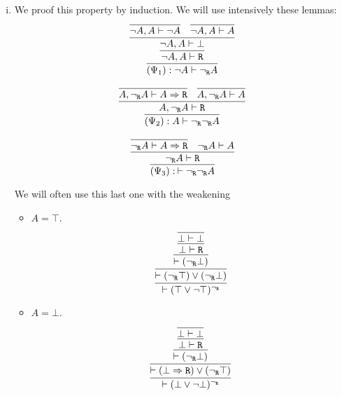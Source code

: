 \begin{enumerate}[(i)]
    \item We proof this property by induction.
    We will use intensively these lemmas:
    $$
    \infer{
        (\Psi_1) : \neg A \vdash \neg_\R A
    }{
        \infer{
            \neg A, A \vdash \R
        }{
            \infer{
                \neg A, A \vdash \bot
            }{
                \infer{
                    \neg A, A \vdash \neg A
                }{
                }&
                \infer{
                    \neg A, A \vdash A
                }{
                }
            }
        }
    }
    $$
    
    $$
    \infer{
        (\Psi_2) : A \vdash \neg_\R \neg_\R A
    }{
        \infer{
            A, \neg_\R A \vdash \R
        }{
            \infer{
                A, \neg_\R A \vdash A\Rightarrow \R
            }{
            }&
            \infer{
                A, \neg_\R A \vdash A
            }{
            }
        }
    }
    $$
    
    $$
    \infer{
        (\Psi_3) :\: \vdash \neg_\R \neg_\R A
    }{
        \infer{
             \neg_\R A \vdash \R
        }{
            \infer{
                 \neg_\R A \vdash A\Rightarrow \R
            }{
            }&
            \neg_\R A \vdash A
        }
    }
    $$
    
    We will often use this last one with the weakening
    
    \begin{itemize}
        \item $A = \top$.
            $$
            \infer{
                \vdash (\top \vee \neg \top)^{\neg_\R}
            }{
                \infer{
                    \vdash (\neg_\R \top) \vee (\neg_\R \bot)
                }{
                    \infer{
                        \vdash (\neg_\R \bot)
                    }{
                        \infer{
                            \bot \vdash \R
                        }{
                            \infer{
                                \bot \vdash \bot
                            }{
                            }
                        }
                    }
                }
            }
            $$
        \item $A = \bot$.
            $$
            \infer{
                \vdash (\bot \vee \neg \bot)^{\neg_\R}
            }{
                \infer{
                    \vdash (\bot \Rightarrow \R) \vee (\neg_\R \top)
                }{
                    \infer{
                        \vdash (\neg_\R \bot)
                    }{
                        \infer{
                            \bot \vdash \R
                        }{
                            \infer{\bot \vdash \bot}{}
                        }
                    }
                }
            }
            $$


\end{itemize}
\end{enumerate}
